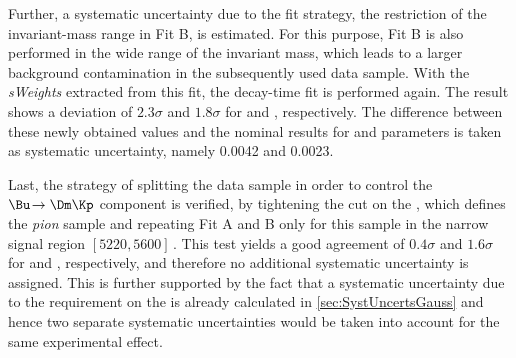Further, a systematic uncertainty due to the fit strategy, \ie the restriction of the invariant-mass range in Fit B, is estimated.
For this purpose, Fit B is also performed in the wide range of the invariant mass, which leads to a larger background contamination in the subsequently used data sample.
With the \emph{sWeights} extracted from this fit, the decay-time fit is performed again.
The result shows a deviation of $2.3\sigma$ and $1.8\sigma$ for \Sf and \Sfbar, respectively.
The difference between these newly obtained values and the nominal results for \Sf and \Sfbar parameters is taken as systematic uncertainty, namely \num{0.0042} and \num{0.0023}.

Last, the strategy of splitting the data sample in order to control the $\Bu\!\to\Dm\Kp$ component is verified, by tightening the cut on the \dllkpi, which defines the \emph{pion} sample and repeating Fit A and B only for this sample in the narrow signal region $[5220, 5600]\,$\si[per-mode=symbol]{\MeVcc}.
This test yields a good agreement of $0.4\sigma$ and $1.6\sigma$ for \Sf and \Sfbar, respectively, and therefore no additional systematic uncertainty is assigned.
This is further supported by the fact that a systematic uncertainty due to the requirement on the \dllkpi is already calculated in \cref{sec:SystUncertsGauss} and hence two separate systematic uncertainties would be taken into account for the same experimental effect.

